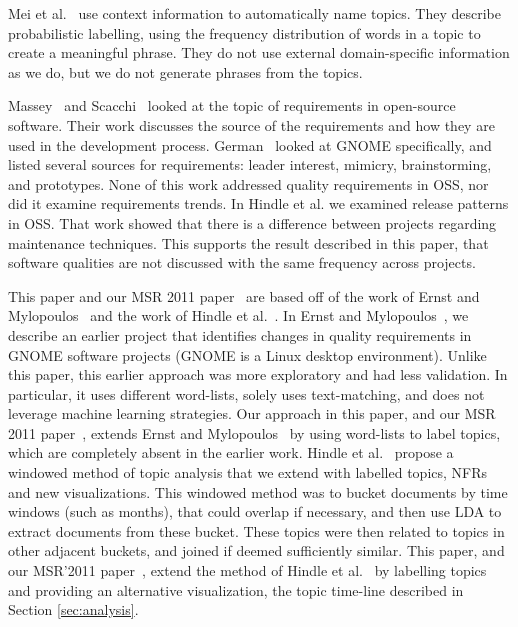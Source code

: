 \documentclass[smallextended]{svjour3}       %
\begin{document}
Mei et al.~\cite{Mei2007} use context information to automatically name topics. 
They describe probabilistic labelling, using the frequency distribution of words in a topic to create a meaningful phrase. 
They do not use external domain-specific information as we do, but we
do not generate phrases from the topics.


Massey~\cite{massey02icse} and Scacchi~\cite{scacchi05b} looked at the topic of requirements in open-source software. 
Their work discusses the source of the requirements and how they are used in the development process. 
 German~\cite{german03gnome} looked at GNOME specifically, and listed several sources for requirements: leader interest, mimicry, brainstorming, and prototypes. 
None of this work  addressed quality requirements in OSS, nor did it examine requirements trends.
In Hindle et al. \cite{Hindle2007} we examined release patterns in OSS. That work showed that there is a difference between projects regarding maintenance
techniques. This supports the result described in this paper, that software qualities are not discussed with the same frequency across projects.



This paper and our MSR 2011 paper~\cite{msr2011} are based off of the
work of Ernst and Mylopoulos~\cite{ernst10refsq} and the work of Hindle et
al.~\cite{Hindle09ICSM}.
In Ernst and Mylopoulos~\cite{ernst10refsq}, we describe an earlier
project that identifies changes in quality requirements
in GNOME software projects (GNOME is a Linux desktop environment). Unlike this paper, this earlier approach was more exploratory and had
less validation. In particular, it  uses different word-lists, solely uses text-matching,
and does not leverage machine learning strategies.  
Our approach in this paper, and our
MSR 2011 paper~\cite{msr2011}, extends Ernst and Mylopoulos~\cite{ernst10refsq} by using 
word-lists to label topics, which are completely absent in the earlier work.
 Hindle et
al.~\cite{Hindle09ICSM}
 propose a windowed method of topic
analysis that we extend with labelled
topics, NFRs and new visualizations. This windowed method was
to bucket documents  by time windows (such as months), that could overlap if
necessary, and then use LDA to extract documents from these
bucket. These topics were then related to topics in other adjacent
buckets, and joined if deemed sufficiently similar. This paper, and our
MSR'2011 paper~\cite{msr2011}, extend the method of Hindle et
al.~\cite{Hindle09ICSM} by labelling topics
and providing an alternative visualization, the topic time-line
described in Section \ref{sec:analysis}.
\end{document}

